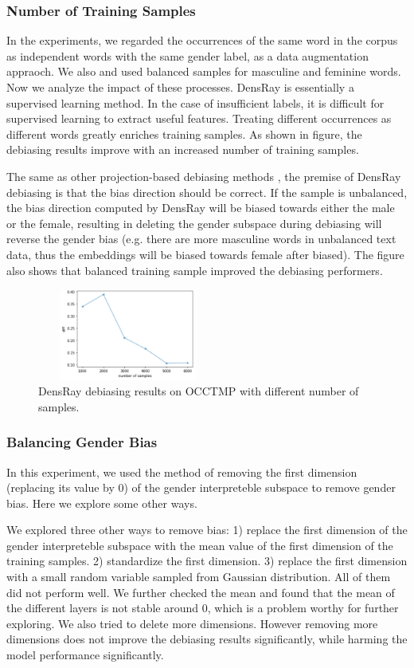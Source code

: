\subsubsection{Number of Training Samples}
In the experiments, we regarded the occurrences of the same word in the corpus as independent words with the same gender label, as a data augmentation appraoch. We also and used balanced samples for masculine and feminine words. Now we analyze the impact of these processes.
DensRay is essentially a supervised learning method. In the case of insufficient labels, it is difficult for supervised learning to extract useful features. Treating different occurrences as different words greatly enriches training samples. As shown in figure, the debiasing results improve with an increased number of training samples.

The same as other projection-based debiasing methods \citep{bolukbasi2016man,zhao2019gender,dev2019attenuating, karve2019conceptor}, the premise of DensRay debiasing is that the bias direction should be correct. If the sample is unbalanced, the bias direction computed by DensRay will be biased towards either the male or the female, resulting in deleting the gender subspace during debiasing will reverse the gender bias (e.g. there are more masculine words in unbalanced text data, thus the embeddings will be biased towards female after biased). The figure also shows that balanced training sample improved the debiasing performers. 
\begin{figure}[ht]
    \centering
    \includegraphics[width=6cm,height=3cm]{samples}
    \caption{DensRay debiasing results on OCCTMP with different number of samples.}
    \label{fig:my_label}
\end{figure}

\subsubsection{Balancing Gender Bias}
In this experiment, we used the method of removing the first dimension (replacing its value by $0$) of the gender interpreteble subspace to remove gender bias. Here we explore some other ways.

We explored three other ways to remove bias: 1) replace the first dimension of the gender interpreteble subspace with the mean value of the first dimension of the training samples. 2) standardize the first dimension. 3) replace the first dimension with a small random variable sampled from Gaussian distribution. All of them did not perform well. We further checked the mean and found that the mean of the different layers is not stable around 0, which is a problem worthy for further exploring. We also tried to delete more dimensions. However removing more dimensions does not improve the debiasing results significantly, while harming the model performance significantly.


